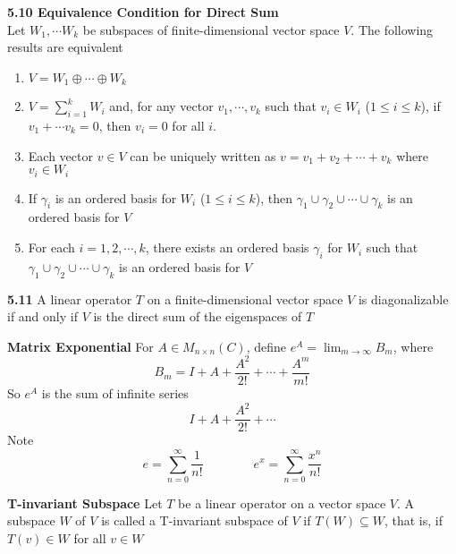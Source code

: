 \documentclass[11pt]{article}
\begin{document}
\begin{theorem*}
    \textbf{5.10 Equivalence Condition for Direct Sum} \\
    Let $W_1, \cdots W_k$ be subspaces of finite-dimensional vector space $V$. The following results are equivalent
    \begin{enumerate}
        \item $V = W_1 \oplus \cdots \oplus W_k$ 
        \item $V = \textstyle\sum_{i=1}^k W_i$ and, for any vector $v_1, \cdots, v_k$ such that $v_i \in W_i$ ($1\leq i \leq k$), if $v_1 + \cdots v_k = 0$, then $v_i = 0$ for all $i$.
        \item Each vector $v\in V$ can be uniquely written as $v = v_1 + v_2 + \cdots + v_k$ where $v_i \in W_i$ 
        \item If $\gamma_i$ is an ordered basis for $W_i$ ($1\leq i \leq k$), then $\gamma_1 \cup \gamma_2 \cup \cdots \cup \gamma_k$ is an ordered basis for $V$
        \item For each $i = 1,2,\cdots, k$, there exists an ordered basis $\gamma_i$ for $W_i$ such that $\gamma_1 \cup \gamma_2 \cup\cdots \cup \gamma_k$ is an ordered basis for $V$ 
    \end{enumerate}
\end{theorem*}

\begin{theorem*}
    \textbf{5.11} A linear operator $T$ on a finite-dimensional vector space $V$ is diagonalizable if and only if $V$ is the direct sum of the eigenspaces of $T$
\end{theorem*}




\begin{defn*}
    \textbf{Matrix Exponential} For $A\in M_{n\times n}(C)$, define $e^A = \lim_{m\to \infty} B_m$, where 
    \[
        B_m = I + A + \frac{A^2}{2!} + \cdots + \frac{A^m}{m!}    
    \]
    So $e^A$ is the sum of infinite series 
    \[
        I+A+ \frac{A^2}{2!} + \cdots   
    \]
    Note 
    \[
        e = \sum_{n=0}^{\infty} \frac{1}{n!}    
        \quad \quad \quad \quad 
        e^x = \sum_{n=0}^{\infty} \frac{x^n}{n!}
    \]
\end{defn*}





\begin{defn*}
    \textbf{T-invariant Subspace} Let $T$ be a linear operator on a vector space $V$. A subspace $W$ of $V$ is called a T-invariant subspace of $V$ if $T(W) \subseteq W$, that is, if $T(v)\in W$ for all $v\in W$
\end{defn*}
\end{document}
